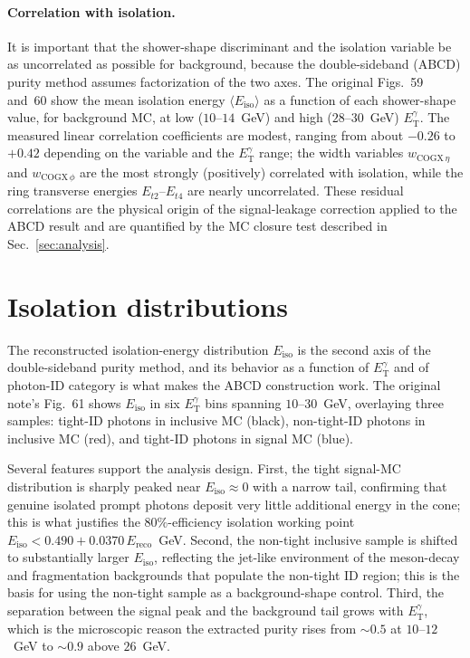 \documentclass[11pt]{article}
\newcommand{\ETg}{E_{\mathrm{T}}^{\gamma}}
\newcommand{\Eiso}{E_{\mathrm{iso}}}
\begin{document}
\paragraph{Correlation with isolation.} It is important that the shower-shape
discriminant and the isolation variable be as uncorrelated as possible for
background, because the double-sideband (ABCD) purity method assumes
factorization of the two axes. The original Figs.~59 and~60 show the mean
isolation energy $\langle \Eiso\rangle$ as a function of each shower-shape value,
for background MC, at low ($10$--$14$~GeV) and high ($28$--$30$~GeV) $\ETg$. The
measured linear correlation coefficients are modest, ranging from about $-0.26$
to $+0.42$ depending on the variable and the $\ETg$ range; the width variables
$w_{\mathrm{COGX}\,\eta}$ and $w_{\mathrm{COGX}\,\phi}$ are the most strongly
(positively) correlated with isolation, while the ring transverse energies
$E_{t2}$--$E_{t4}$ are nearly uncorrelated. These residual correlations are the
physical origin of the signal-leakage correction applied to the ABCD result and
are quantified by the MC closure test described in Sec.~\ref{sec:analysis}.

\section{Isolation distributions}
\label{app:isodist}
The reconstructed isolation-energy distribution $\Eiso$ is the second axis of the
double-sideband purity method, and its behavior as a function of $\ETg$ and of
photon-ID category is what makes the ABCD construction work. The original note's
Fig.~61 shows $\Eiso$ in six $\ETg$ bins spanning $10$--$30$~GeV, overlaying three
samples: tight-ID photons in inclusive MC (black), non-tight-ID photons in
inclusive MC (red), and tight-ID photons in signal MC (blue).

Several features support the analysis design. First, the tight signal-MC
distribution is sharply peaked near $\Eiso \approx 0$ with a narrow tail,
confirming that genuine isolated prompt photons deposit very little additional
energy in the cone; this is what justifies the $80\%$-efficiency isolation
working point $\Eiso < 0.490 + 0.0370\,E_{\mathrm{reco}}$~GeV. Second, the
non-tight inclusive sample is shifted to substantially larger $\Eiso$, reflecting
the jet-like environment of the meson-decay and fragmentation backgrounds that
populate the non-tight ID region; this is the basis for using the non-tight
sample as a background-shape control. Third, the separation between the signal
peak and the background tail grows with $\ETg$, which is the microscopic reason
the extracted purity rises from $\sim0.5$ at $10$--$12$~GeV to $\sim0.9$ above
$26$~GeV.
\end{document}
